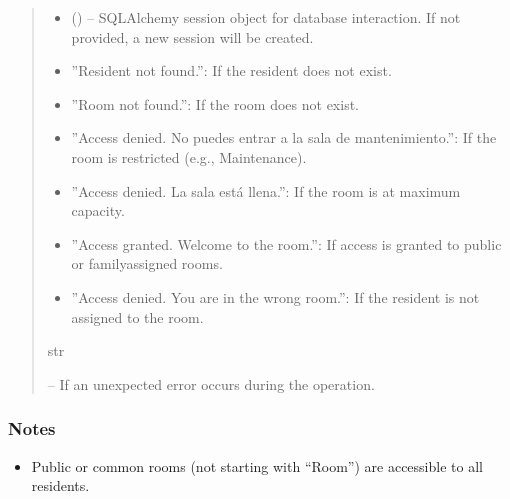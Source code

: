 \documentclass[letterpaper,10pt,english]{sphinxmanual}
\begin{document}
\begin{fulllineitems}
\begin{fulllineitems}
\begin{quote}
\begin{description}
\begin{itemize}
\item {} 
\sphinxAtStartPar
{} (\sphinxstyleliteralemphasis{\sphinxupquote{, }}) – SQLAlchemy session object for database interaction.
If not provided, a new session will be created.

\end{itemize}

\sphinxAtStartPar
\begin{description}
\begin{itemize}
\item {} 
\sphinxAtStartPar
”Resident not found.”: If the resident does not exist.

\item {} 
\sphinxAtStartPar
”Room not found.”: If the room does not exist.

\item {} 
\sphinxAtStartPar
”Access denied. No puedes entrar a la sala de mantenimiento.”: If the room is restricted (e.g., Maintenance).

\item {} 
\sphinxAtStartPar
”Access denied. La sala está llena.”: If the room is at maximum capacity.

\item {} 
\sphinxAtStartPar
”Access granted. Welcome to the room.”: If access is granted to public or family\sphinxhyphen{}assigned rooms.

\item {} 
\sphinxAtStartPar
”Access denied. You are in the wrong room.”: If the resident is not assigned to the room.

\end{itemize}

\end{description}


\sphinxAtStartPar
str

\sphinxAtStartPar
{} – If an unexpected error occurs during the operation.

\end{description}\end{quote}
\subsubsection*{Notes}
\begin{itemize}
\item {} 
\sphinxAtStartPar
Public or common rooms (not starting with “Room”) are accessible to all residents.


\end{itemize}
\end{fulllineitems}
\end{fulllineitems}
\end{document}
